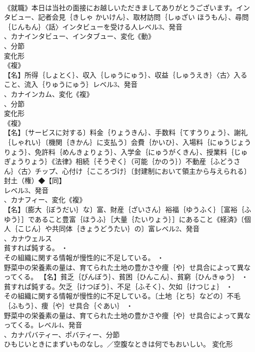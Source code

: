 \documentclass[8pt]{extreport}
\begin{document}
\begin{CJK}{UTF8}{min}
\\	《就職》本日は当社の面接にお越しいただきましてありがとうございます。インタビュー、記者会見｛きしゃ かいけん｝、取材訪問｛しゅざい ほうもん｝、尋問｛じんもん｝〈話〉インタビューを受ける人レベル3、発音
\\	、カナインタビュー、インタブュー、変化《動》
\\	、分節
\\	変化形 
\\	《複》
\\	【名】所得｛しょとく｝、収入｛しゅうにゅう｝、収益｛しゅうえき｝〈古〉入ること、流入｛りゅうにゅう｝レベル3、発音
\\	、カナインカム、変化《複》
\\	、分節
\\	変化形 
\\	《複》
\\	【名】〔サービスに対する〕料金｛りょうきん｝、手数料｛てすうりょう｝、謝礼｛しゃれい｝〔機関｛きかん｝に支払う〕会費｛かいひ｝、入場料｛にゅうじょうりょう｝、免許料｛めんきょりょう｝、入学金｛にゅうがくきん｝、授業料｛じゅぎょうりょう｝《法律》相続｛そうぞく｝（可能｛かのう｝）不動産｛ふどうさん｝〈古〉チップ、心付け｛こころづけ｝〔封建制において領主から与えられる〕封土（権）◆【同】
\\	レベル3、発音
\\	、カナフィー、変化《複》
\\	【名】〔膨大｛ぼうだい｝な〕富、財産｛ざいさん｝裕福｛ゆうふく｝［富裕｛ふゆう｝］であること豊富｛ほうふ｝［大量｛たいりょう｝］にあること《経済》〔個人｛こじん｝や共同体｛きょうどうたい｝の〕富レベル2、発音
\\	、カナウェルス
\\	貧すれば鈍する。 ・
\\	その組織に関する情報が慢性的に不足している。 ・
\\	野菜中の栄養素の量は、育てられた土地の豊かさや痩｛や｝せ具合によって異なってくる。		【名】貧乏｛びんぼう｝、貧困｛ひんこん｝、貧窮｛ひんきゅう｝ ・
\\	貧すれば鈍する。欠乏｛けつぼう｝、不足｛ふそく｝、欠如｛けつじょ｝ ・
\\	その組織に関する情報が慢性的に不足している。〔土地｛とち｝などの〕不毛｛ふもう｝、痩｛や｝せ具合｛ぐあい｝ ・
\\	野菜中の栄養素の量は、育てられた土地の豊かさや痩｛や｝せ具合によって異なってくる。レベル4、発音
\\	、カナパバティー、ポバティー、分節
\\	ひもじいときにまずいものなし。／空腹なときは何でもおいしい。	変化形 

\end{CJK}
\end{document}
